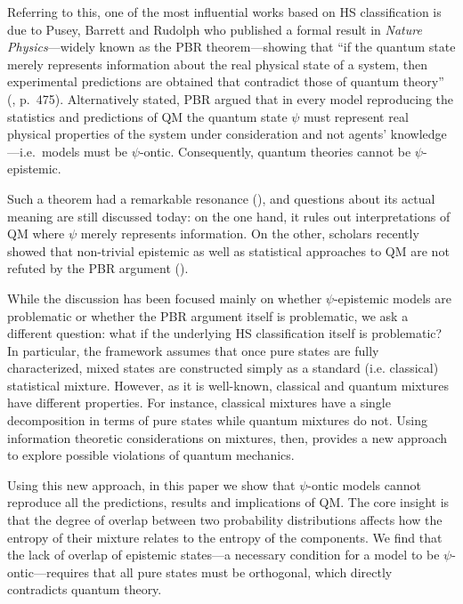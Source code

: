 \documentclass[10pt,twocolumn, nofootinbib]{revtex4-2}
\begin{document}
Referring to this, one of the most influential works based on HS classification is due to Pusey, Barrett and Rudolph who published a formal result in \emph{Nature Physics}---widely known as the PBR theorem---showing that ``if the quantum state merely represents information about the real physical state of a system, then experimental predictions are obtained that contradict those of quantum theory'' (\cite{PBR:2012}, p.\ 475). Alternatively stated, PBR argued that in every model reproducing the statistics and predictions of QM the quantum state $\psi$ must represent real physical properties of the system under consideration and not agents' knowledge---i.e.\ models must be $\psi$-ontic. Consequently, quantum theories cannot be $\psi$-epistemic. 

Such a theorem had a remarkable resonance (\cite{Leifer:2014, Leifer:2014b, Lewis:2012, Renner:2012, Colbeck:2017, Hardy:2013, Maroney:2014, Patra:2013, Mansfield:2016, Schlosshauer:2012, Schlosshauer:2013, Schlosshauer:2014, Aaronson:2013}), and questions about its actual meaning are still discussed today: on the one hand, it rules out interpretations of QM where $\psi$ merely represents information. On the other, scholars recently showed that non-trivial epistemic as well as statistical approaches to QM are not refuted by the PBR argument (\cite{Ben:2017, Rizzi:2018, Oldofredi:2021, DeBrota:2019}).

While the discussion has been focused mainly on whether $\psi$-epistemic models are problematic or whether the PBR argument itself is problematic, we ask a different question: what if the underlying HS classification itself is problematic? In particular, the framework assumes that once pure states are fully characterized, mixed states are constructed simply as a standard (i.e. classical) statistical mixture. However, as it is well-known, classical and quantum mixtures have different properties. For instance, classical mixtures have a single decomposition in terms of pure states while quantum mixtures do not. Using information theoretic considerations on mixtures, then, provides a new approach to explore possible violations of quantum mechanics.

Using this new approach, in this paper we show that $\psi$-ontic models cannot reproduce all the predictions, results and implications of QM. The core insight is that the degree of overlap between two probability distributions affects how the entropy of their mixture relates to the entropy of the components. We find that the lack of overlap of epistemic states---a necessary condition for a model to be $\psi$-ontic---requires that all pure states must be orthogonal, which directly contradicts quantum theory. 
\end{document}
